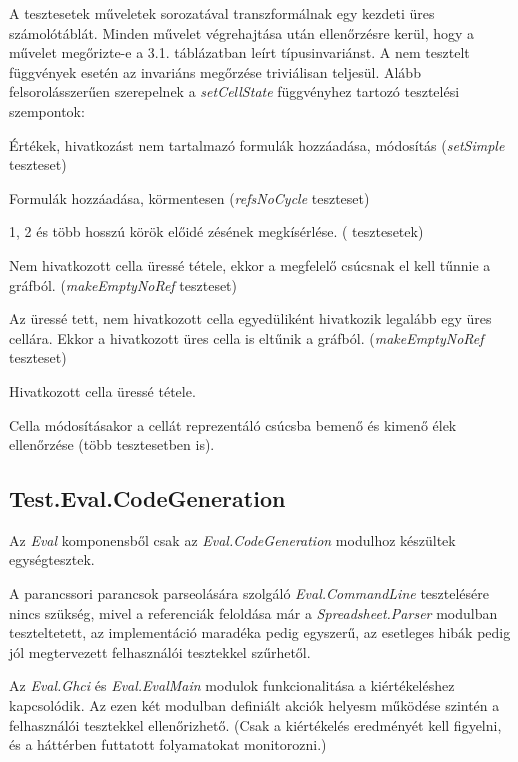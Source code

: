 A tesztesetek műveletek sorozatával transzformálnak egy kezdeti üres számolótáblát. Minden művelet végrehajtása után ellenőrzésre kerül, hogy a művelet megőrizte-e a 3.1. táblázatban leírt típusinvariánst. A nem tesztelt függvények esetén az invariáns megőrzése triviálisan teljesül.
Alább felsorolásszerűen szerepelnek a \textit{setCellState} függvényhez tartozó tesztelési szempontok:

\begin{compactenum}
	\item Értékek, hivatkozást nem tartalmazó formulák hozzáadása, módosítás (\textit{setSimple} teszteset)
	\item Formulák hozzáadása, körmentesen (\textit{refsNoCycle} teszteset)
	\item 1, 2 és több hosszú körök előidé	zésének megkísérlése. ( tesztesetek)
	\item Nem hivatkozott cella üressé tétele, ekkor a megfelelő csúcsnak el kell tűnnie a gráfból. (\textit{makeEmptyNoRef} teszteset)
	\item Az üressé tett, nem hivatkozott cella egyedüliként hivatkozik legalább egy üres cellára. Ekkor a hivatkozott üres cella is eltűnik a gráfból. (\textit{makeEmptyNoRef} teszteset)
	\item Hivatkozott cella üressé tétele.
	\item Cella módosításakor a cellát reprezentáló csúcsba bemenő és kimenő élek ellenőrzése (több tesztesetben is).
\end{compactenum}

\subsection{Test.Eval.CodeGeneration}

Az \textit{Eval} komponensből csak az \textit{Eval.CodeGeneration} modulhoz készültek egységtesztek. 

A parancssori parancsok parseolására szolgáló \textit{Eval.CommandLine} tesztelésére nincs szükség, mivel a referenciák feloldása már a \textit{Spreadsheet.Parser} modulban teszteltetett, az implementáció maradéka pedig egyszerű, az esetleges hibák pedig jól megtervezett felhasználói tesztekkel szűrhetől.

Az \textit{Eval.Ghci} és \textit{Eval.EvalMain} modulok funkcionalitása a kiértékeléshez kapcsolódik. Az ezen két modulban definiált akciók helyesm működése szintén a felhasználói tesztekkel ellenőrizhető. (Csak a kiértékelés eredményét kell figyelni, és a háttérben futtatott folyamatokat monitorozni.)

